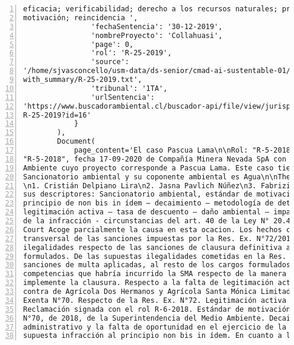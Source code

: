 \begin{Verbatim}[frame=lines, label=Elavoración propia -  Ejemplo de Contexto enviado por el Chatbot a OpenAI
				, fontsize=\scriptsize, numbers=left
				, baselinestretch=0.4
				, formatcom=\color{gray}]
eficacia; verificabilidad; derecho a los recursos naturales; principio de participación;
motivación; reincidencia ',
                'fechaSentencia': '30-12-2019',
                'nombreProyecto': 'Collahuasi',
                'page': 0,
                'rol': 'R-25-2019',
                'source':
'/home/sjvasconcello/usm-data/ds-senior/cmad-ai-sustentable-01/etl/load/../../data/clean/docs_
with_summary/R-25-2019.txt',
                'tribunal': '1TA',
                'urlSentencia':
'https://www.buscadorambiental.cl/buscador-api/file/view/jurisprudencia/S1TA Rol N°
R-25-2019?id=16'
            }
        ),
        Document(
            page_content='El caso Pascua Lama\n\nRol: "R-5-2018", Rol: "R-5-2018",Rol:
"R-5-2018", fecha 17-09-2020 de Compañía Minera Nevada SpA con Superintendencia del Medio
Ambiente cuyo proyecto corresponde a Pascua Lama. Este caso tiene como principal materia
Sancionatorio ambiental y su coponente ambiental es Agua\n\nThe integration ministers are:
\n1. Cristián Delpiano Lira\n2. Jasna Pavlich Núñez\n3. Fabrizio Queirolo Pellerano\n\nSiendo
sus descriptores: Sancionatorio ambiental, estándar de motivación – proporcionalidad –
principio de non bis in ídem – decaimiento – metodología de determinación de sanciones –
legitimación activa – tasa de descuento – daño ambiental – impacto ambiental – clasificación
de la infracción - circunstancias del art. 40 de la Ley N° 20.417\n\nEl First Environmental
Court Acoge parcialmente la causa en esta ocacion. Los hechos controvertidos son: Ilegalidad
transversal de las sanciones impuestas por la Res. Ex. N°72/2018. De las supuestas
ilegalidades respecto de las sanciones de clausura definitiva aplicadas a cinco de los cargos
formulados. De las supuestas ilegalidades cometidas en la Res. Ex. N°72/2018, respecto de las
sanciones de multa aplicadas, al resto de los cargos formulados. Del supuesto exceso en las
competencias que habría incurrido la SMA respecto de la manera en que pretende que se
implemente la clausura. Respecto a la falta de legitimación activa alegada por la SMA en
contra de Agrícola Dos Hermanos y Agrícola Santa Mónica Limitada. Respecto de la Resolución
Exenta N°70. Respecto de la Res. Ex. N°72. Legitimación activa de los reclamantes de la
Reclamación signada con el rol R-6-2018. Estándar de motivación exigido. Resolución Exenta
N°70, de 2018, de la Superintendencia del Medio Ambiente. Decaimiento del procedimiento
administrativo y la falta de oportunidad en el ejercicio de la potestad sancionatorio. De la
supuesta infracción al principio non bis in ídem. En cuanto a la metodología para la

\end{Verbatim}

